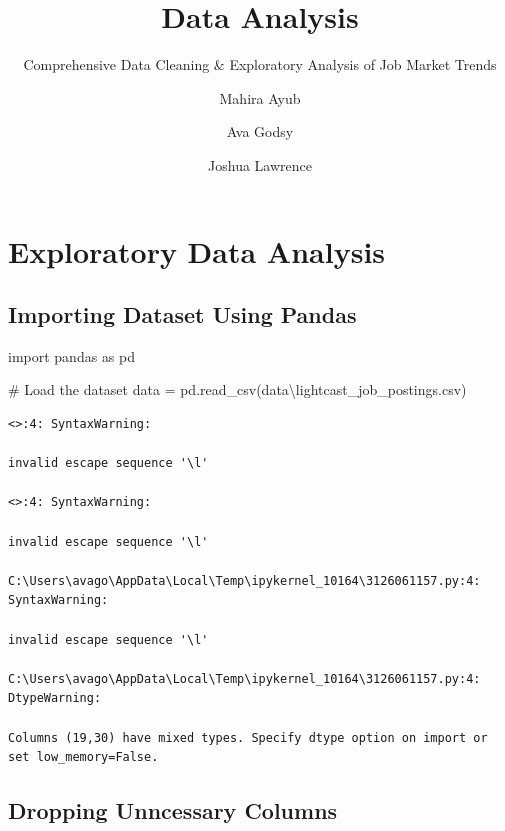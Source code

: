 \documentclass[
  letterpaper,
  DIV=11,
  numbers=noendperiod]{scrartcl}
\title{Data Analysis}
\subtitle{Comprehensive Data Cleaning \& Exploratory Analysis of Job
Market Trends}
\author{Mahira Ayub \and Ava Godsy \and Joshua Lawrence}
\date{}
\newenvironment{Shaded}{\begin{snugshade}}{\end{snugshade}}
\newcommand{\CommentTok}[1]{\textcolor[rgb]{0.37,0.37,0.37}{#1}}
\newcommand{\ErrorTok}[1]{\textcolor[rgb]{0.68,0.00,0.00}{#1}}
\newcommand{\ImportTok}[1]{\textcolor[rgb]{0.00,0.46,0.62}{#1}}
\newcommand{\NormalTok}[1]{\textcolor[rgb]{0.00,0.23,0.31}{#1}}
\newcommand{\OperatorTok}[1]{\textcolor[rgb]{0.37,0.37,0.37}{#1}}
\newcommand{\StringTok}[1]{\textcolor[rgb]{0.13,0.47,0.30}{#1}}
\begin{document}
\maketitle


\section{Exploratory Data Analysis}\label{exploratory-data-analysis}

\subsection{Importing Dataset Using
Pandas}\label{importing-dataset-using-pandas}

\begin{Shaded}
\begin{Highlighting}[]
\ImportTok{import}\NormalTok{ pandas }\ImportTok{as}\NormalTok{ pd}

\CommentTok{\# Load the dataset}
\NormalTok{data }\OperatorTok{=}\NormalTok{ pd.read\_csv(}\StringTok{\textquotesingle{}data}\ErrorTok{\textbackslash{}}\StringTok{lightcast\_job\_postings.csv\textquotesingle{}}\NormalTok{)}
\end{Highlighting}
\end{Shaded}

\begin{verbatim}
<>:4: SyntaxWarning:

invalid escape sequence '\l'

<>:4: SyntaxWarning:

invalid escape sequence '\l'

C:\Users\avago\AppData\Local\Temp\ipykernel_10164\3126061157.py:4: SyntaxWarning:

invalid escape sequence '\l'

C:\Users\avago\AppData\Local\Temp\ipykernel_10164\3126061157.py:4: DtypeWarning:

Columns (19,30) have mixed types. Specify dtype option on import or set low_memory=False.
\end{verbatim}

\subsection{Dropping Unncessary
Columns}\label{dropping-unncessary-columns}
\end{document}
